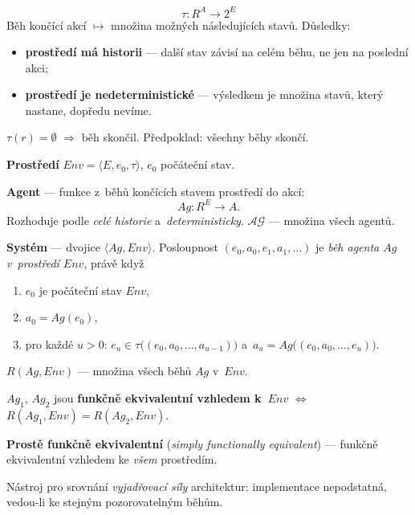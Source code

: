 \documentclass[11pt,a4paper]{article}
\theoremstyle{definition}
\begin{document}
\begin{defbox}
\[
\tau : R^A \to 2^E
\]
Běh končící akcí $\mapsto$ množina možných následujících stavů. Důsledky:
\begin{itemize}
\item \textbf{prostředí má historii} --- další stav závisí na celém běhu, ne jen na poslední akci;
\item \textbf{prostředí je nedeterministické} --- výsledkem je množina stavů, který nastane,
  dopředu nevíme.
\end{itemize}
$\tau(r) = \emptyset$ $\Rightarrow$ běh skončil. Předpoklad: všechny běhy skončí.

\textbf{Prostředí} $\mathit{Env} = \langle E, e_0, \tau\rangle$, $e_0$ počáteční stav.
\end{defbox}

\begin{defbox}
\textbf{Agent} --- funkce z~běhů končících stavem prostředí do akcí:
\[
Ag : R^E \to A .
\]
Rozhoduje podle \emph{celé historie} a~\emph{deterministicky}. $\mathcal{AG}$ --- množina všech
agentů.

\textbf{Systém} --- dvojice $\langle Ag, \mathit{Env}\rangle$. Posloupnost $(e_0, a_0, e_1, a_1,
\dots)$ je \emph{běh agenta $Ag$ v~prostředí $\mathit{Env}$}, právě když
\begin{enumerate}
\item $e_0$ je počáteční stav $\mathit{Env}$,
\item $a_0 = Ag(e_0)$,
\item pro každé $u > 0$: $e_u \in \tau\big((e_0,a_0,\dots,a_{u-1})\big)$
  a~$a_u = Ag\big((e_0,a_0,\dots,e_u)\big)$.
\end{enumerate}
$R(Ag,\mathit{Env})$ --- množina všech běhů $Ag$ v~$\mathit{Env}$.
\end{defbox}

\begin{defbox}
$Ag_1$, $Ag_2$ jsou \textbf{funkčně ekvivalentní vzhledem k~$\mathit{Env}$} $\iff$
$R(Ag_1,\mathit{Env}) = R(Ag_2,\mathit{Env})$.

\textbf{Prostě funkčně ekvivalentní} (\emph{simply functionally equivalent}) --- funkčně
ekvivalentní vzhledem ke \emph{všem} prostředím.
\end{defbox}

Nástroj pro srovnání \emph{vyjadřovací síly} architektur: implementace nepodstatná, vedou-li
ke stejným pozorovatelným běhům.
\end{document}
